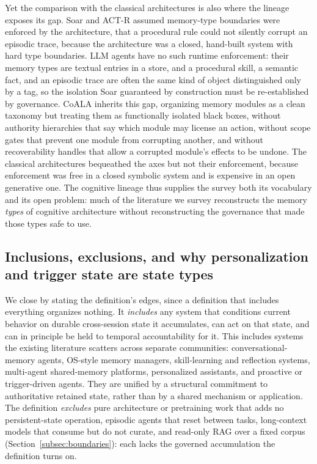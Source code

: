 Yet the comparison with the classical architectures is also where the lineage exposes its gap. Soar and ACT-R assumed memory-type boundaries were enforced by the architecture, that a procedural rule could not silently corrupt an episodic trace, because the architecture was a closed, hand-built system with hard type boundaries. LLM agents have no such runtime enforcement: their memory types are textual entries in a store, and a procedural skill, a semantic fact, and an episodic trace are often the same kind of object distinguished only by a tag, so the isolation Soar guaranteed by construction must be re-established by governance. CoALA inherits this gap, organizing memory modules as a clean taxonomy but treating them as functionally isolated black boxes, without authority hierarchies that say which module may license an action, without scope gates that prevent one module from corrupting another, and without recoverability handles that allow a corrupted module's effects to be undone. The classical architectures bequeathed the axes but not their enforcement, because enforcement was free in a closed symbolic system and is expensive in an open generative one. The cognitive lineage thus supplies the survey both its vocabulary and its open problem: much of the literature we survey reconstructs the memory \emph{types} of cognitive architecture without reconstructing the governance that made those types safe to use.

\subsection{Inclusions, exclusions, and why personalization and trigger state are state types}\label{subsec:include-exclude}

We close by stating the definition's edges, since a definition that includes everything organizes nothing. It \emph{includes} any system that conditions current behavior on durable cross-session state it accumulates, can act on that state, and can in principle be held to temporal accountability for it. This includes systems the existing literature scatters across separate communities: conversational-memory agents, OS-style memory managers, skill-learning and reflection systems, multi-agent shared-memory platforms, personalized assistants, and proactive or trigger-driven agents. They are unified by a structural commitment to authoritative retained state, rather than by a shared mechanism or application. The definition \emph{excludes} pure architecture or pretraining work that adds no persistent-state operation, episodic agents that reset between tasks, long-context models that consume but do not curate, and read-only RAG over a fixed corpus (Section~\ref{subsec:boundaries}): each lacks the governed accumulation the definition turns on.


